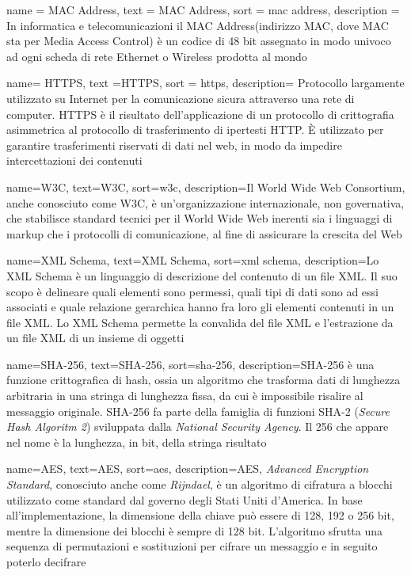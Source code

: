 {
	name = {MAC Address},
	text = {MAC Address},
	sort = {mac address},
	description = {In informatica e telecomunicazioni il MAC Address(indirizzo MAC, dove MAC sta per Media Access Control) è un codice di 48 bit assegnato in modo univoco ad ogni scheda di rete Ethernet o Wireless prodotta al mondo}
}

{
	name= {HTTPS},
	text ={HTTPS},
	sort = {https},
	description= {Protocollo largamente utilizzato su Internet per la comunicazione sicura attraverso una rete di computer. HTTPS è il risultato dell'applicazione di un protocollo di crittografia asimmetrica al protocollo di trasferimento di ipertesti HTTP. È utilizzato per garantire trasferimenti riservati di dati nel web, in modo da impedire intercettazioni dei contenuti}
}

{
	name={W3C},
	text={W3C},
	sort={w3c},
	description={Il World Wide Web Consortium, anche conosciuto come W3C, è un'organizzazione internazionale, non governativa, che stabilisce standard tecnici per il World Wide Web inerenti sia i linguaggi di markup che i protocolli di comunicazione, al fine di assicurare la crescita del Web}
}	

{
	name={XML Schema},
	text={XML Schema},
	sort={xml schema},
	description={Lo XML Schema è un linguaggio di descrizione del contenuto di un file XML. Il suo scopo è delineare quali elementi sono permessi, quali tipi di dati sono ad essi associati e quale relazione gerarchica hanno fra loro gli elementi contenuti in un file XML. Lo XML Schema permette la convalida del file XML e l'estrazione da un file XML di un insieme di oggetti}
}
	
{
	name={SHA-256},
	text={SHA-256},
	sort={sha-256},
	description={SHA-256 è una funzione crittografica di hash, ossia un algoritmo che trasforma dati di lunghezza arbitraria in una stringa di lunghezza fissa, da cui è impossibile risalire al messaggio originale. SHA-256 fa parte della famiglia di funzioni SHA-2 (\textit{Secure Hash Algoritm 2}) sviluppata dalla \textit{National Security Agency}. Il 256 che appare nel nome è la lunghezza, in bit, della stringa risultato}
}

{
	name={AES},
	text={AES},
	sort={aes},
	description={AES, \textit{Advanced Encryption Standard}, conosciuto anche come \textit{Rijndael}, è un algoritmo di cifratura a blocchi utilizzato come standard dal governo degli Stati Uniti d'America. In base all'implementazione, la dimensione della chiave può essere di 128, 192 o 256 bit, mentre la dimensione dei blocchi è sempre di 128 bit. L'algoritmo sfrutta una sequenza di permutazioni e sostituzioni per cifrare un messaggio e in seguito poterlo decifrare}
}

